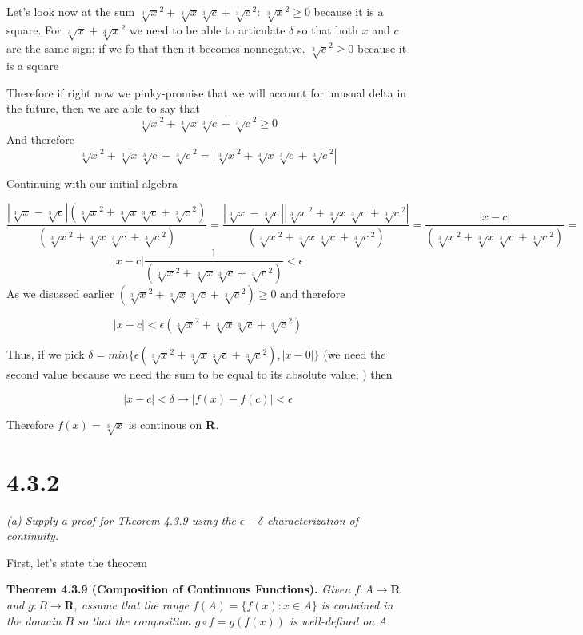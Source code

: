 \documentclass[11pt,oneside,titlepage]{book}
\begin{document}
Let's look now at the sum  $\sqrt[3]{x} ^ 2 + \sqrt[3]{x}\sqrt[3]{c} +
\sqrt[3]{c}^2$: $\sqrt[3]{x} ^ 2 \geq 0 $ because it is a square. For
$\sqrt[3]{x} + \sqrt[3]{x} ^ 2$ we need to be able to articulate $\delta$ so
that both $x$ and $c$ are the same sign; if we fo that then it becomes
nonnegative. $\sqrt[3]{c} ^ 2 \geq 0 $ because it is a square

Therefore if right now we pinky-promise that we will account for unusual delta
in the future, then we are able to say that 
$$\sqrt[3]{x} ^ 2 + \sqrt[3]{x}\sqrt[3]{c} + \sqrt[3]{c}^2 \geq 0 $$
And therefore
$$\sqrt[3]{x} ^ 2 + \sqrt[3]{x}\sqrt[3]{c} + \sqrt[3]{c}^2 =
|\sqrt[3]{x} ^ 2 + \sqrt[3]{x}\sqrt[3]{c} + \sqrt[3]{c}^2| $$

Continuing with our initial algebra

$$\frac{|\sqrt[3]{x} - \sqrt[3]{c}|(\sqrt[3]{x}^2 + \sqrt[3]{x}\sqrt[3]{c} +
  \sqrt[3]{c} ^ 2)}{(\sqrt[3]{x}^2 + \sqrt[3]{x}\sqrt[3]{c}
  + \sqrt[3]{c} ^ 2)} =
\frac{|\sqrt[3]{x} - \sqrt[3]{c}||\sqrt[3]{x}^2 + \sqrt[3]{x}\sqrt[3]{c} +
  \sqrt[3]{c} ^ 2|}{(\sqrt[3]{x}^2 + \sqrt[3]{x}\sqrt[3]{c}
  + \sqrt[3]{c} ^ 2)} =
\frac{|x - c|}{(\sqrt[3]{x}^2 + \sqrt[3]{x}\sqrt[3]{c}
  + \sqrt[3]{c} ^ 2)} =
$$
$$ |x - c|\frac{1}{(\sqrt[3]{x}^2 + \sqrt[3]{x}\sqrt[3]{c}
  + \sqrt[3]{c} ^ 2)} < \epsilon
$$
As we disussed earlier $(\sqrt[3]{x}^2 + \sqrt[3]{x}\sqrt[3]{c}  +
\sqrt[3]{c} ^ 2) \geq 0$ and therefore 

$$ |x - c| < \epsilon(\sqrt[3]{x}^2 + \sqrt[3]{x}\sqrt[3]{c}
+ \sqrt[3]{c} ^ 2) $$

Thus, if we pick $\delta = min\{\epsilon(\sqrt[3]{x}^2 + \sqrt[3]{x}\sqrt[3]{c}
+ \sqrt[3]{c} ^ 2), |x - 0|\}$ (we need the second value
because we need the sum to be equal to its absolute value; ) then

$$|x - c| < \delta \to |f(x)  - f(c)| < \epsilon$$

Therefore $f(x) = \sqrt[3]{x}$ is continous on \textbf{R}.

\section*{4.3.2}

\textit{(a) Supply a proof for Theorem 4.3.9 using the $\epsilon-\delta$
  characterization of continuity.}

First, let's state the theorem

\textbf{Theorem 4.3.9 (Composition of Continuous Functions).} \textit{Given
  $f: A \to \textbf{R}$ and $g: B \to \textbf{R}$, assume that the range
  $f(A) =\{f(x): x \in A\}$ is contained in the domain $B$ so that the
  composition $g \circ f = g(f(x)) $ is well-defined on $A$. }
\end{document}
